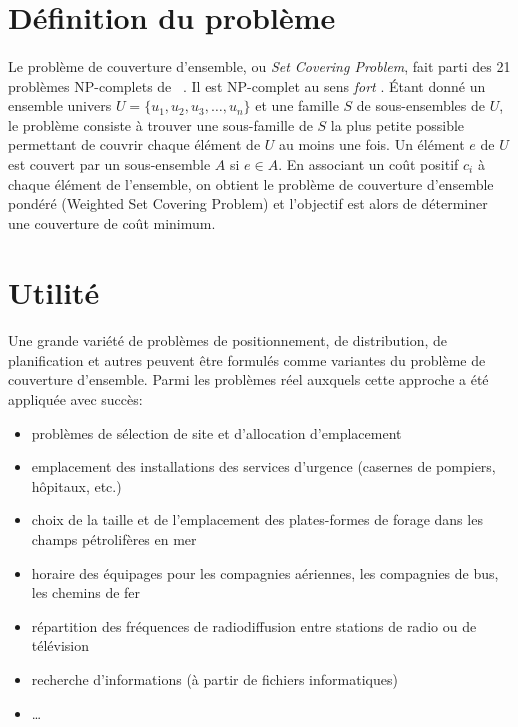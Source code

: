 \documentclass[12pt,letterpaper,twoside]{article}
\begin{document}
	\maketitle{}
	\section{Définition du problème}
		\paragraph*{}
			Le problème de couverture d'ensemble, ou \emph{Set Covering Problem},
			fait parti des 21 problèmes NP-complets de \citeauthor{Karp1972}~\cite{Karp1972}.
			Il est NP-complet au sens \emph{fort} \cite{garey2002computers, caprara2000algorithms}.
			Étant donné un ensemble univers \(U = \{u_1, u_2, u_3, \dots, u_n\}\) et une famille \(S\) de sous-ensembles de \(U\),
			le problème consiste à trouver une sous-famille de \(S\) la plus petite possible permettant de couvrir chaque élément de \(U\)
			au moins une fois. Un élément \(e\) de \(U\) est couvert par un sous-ensemble \(A\) si \(e \in A\). En associant un coût positif \(c_i\)
			à chaque élément de l'ensemble, on obtient le problème de couverture d'ensemble pondéré (Weighted Set Covering Problem) et
			l'objectif est alors de déterminer une couverture de coût minimum.~\cite{Vazirani2003}
	\section{Utilité}
		\paragraph*{}
			Une grande variété de problèmes de positionnement, de distribution, de planification et autres peuvent être formulés comme variantes du problème de couverture d'ensemble. Parmi les problèmes réel auxquels cette approche a été appliquée avec succès:\cite{Balas1982}
			\begin{itemize}
				\item problèmes de sélection de site et d’allocation d’emplacement
				\item emplacement des installations des services d'urgence (casernes de pompiers, hôpitaux, etc.)
				\item choix de la taille et de l'emplacement des plates-formes de forage dans les champs pétrolifères en mer
				\item horaire des équipages pour les compagnies aériennes, les compagnies de bus, les chemins de fer
				\item répartition des fréquences de radiodiffusion entre stations de radio ou de télévision
				\item recherche d'informations (à partir de fichiers informatiques)
				\item \ldots
			\end{itemize}
\end{document}

